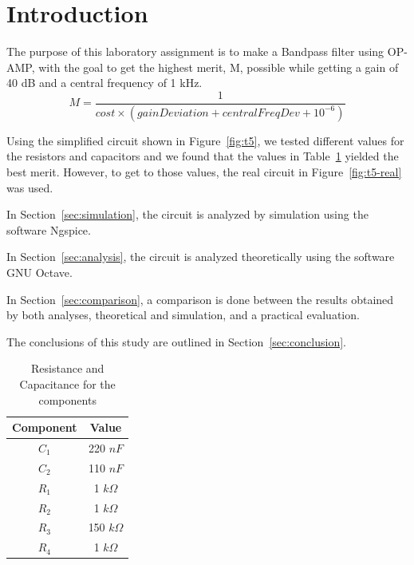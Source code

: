 \section{Introduction}
\label{sec:introduction}

The purpose of this laboratory assignment is to make a Bandpass filter using OP-AMP, with the goal to get the highest merit, M, possible while getting a gain of 40 dB and a central frequency of 1 kHz.
$$ M = \frac{1}{cost \times (gainDeviation + centralFreqDev + 10^{-6})}$$

Using the simplified circuit shown in Figure~\ref{fig:t5}, we tested different values for the resistors and capacitors and we found that the values in Table~\ref{tab:values} yielded the best merit. However, to get to those values, the real circuit in Figure~\ref{fig:t5-real} was used.

In Section~\ref{sec:simulation}, the circuit is analyzed by simulation using the software Ngspice. 

In Section~\ref{sec:analysis}, the circuit is analyzed theoretically using the software GNU Octave. 

In Section~\ref{sec:comparison}, a comparison is done between the results obtained by both analyses, theoretical and simulation, and a practical evaluation.

The conclusions of this study are outlined in Section~\ref{sec:conclusion}.

\begin{table}[ht!]
    \centering
    \begin{tabular}{c c}
    \toprule
    Component & Value \\ \midrule
    $C_1$  & 220 $nF$      \\
    $C_2$  & 110 $nF$      \\
    $R_1$  & 1 $k\Omega$   \\
    $R_2$  & 1 $k\Omega$   \\
    $R_3$  & 150 $k\Omega$ \\
    $R_4$  & 1 $k\Omega$   \\ \bottomrule
    \end{tabular}
    \caption{Resistance and Capacitance for the components}
    \label{tab:values}
\end{table}

